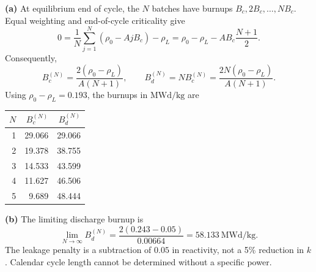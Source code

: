 \begin{adaptedsolution}
\textbf{(a)} At equilibrium end of cycle, the $N$ batches have burnups
$B_c,2B_c,\ldots,NB_c$. Equal weighting and end-of-cycle criticality give
\[
0=\frac{1}{N}\sum_{j=1}^N(\rho_0-AjB_c)-\rho_L
=\rho_0-\rho_L-AB_c\frac{N+1}{2}.
\]
Consequently,
\[
\boxed{B_c^{(N)}=\frac{2(\rho_0-\rho_L)}{A(N+1)},\qquad
B_d^{(N)}=NB_c^{(N)}=\frac{2N(\rho_0-\rho_L)}{A(N+1)}.}
\]
Using $\rho_0-\rho_L=0.193$, the burnups in $\mathrm{MWd/kg}$ are
\begin{center}
\begin{tabular}{rrr}\toprule
$N$ & $B_c^{(N)}$ & $B_d^{(N)}$\\\midrule
1 & 29.066 & 29.066\\
2 & 19.378 & 38.755\\
3 & 14.533 & 43.599\\
4 & 11.627 & 46.506\\
5 & 9.689 & 48.444\\\bottomrule
\end{tabular}
\end{center}
\textbf{(b)} The limiting discharge burnup is
\[
\boxed{\lim_{N\to\infty}B_d^{(N)}=\frac{2(0.243-0.05)}{0.00664}
=58.133~\mathrm{MWd/kg}.}
\]
The leakage penalty is a subtraction of $0.05$ in reactivity, not a 5\% reduction in $k$. Calendar cycle length cannot be determined without a specific power.
\end{adaptedsolution}
